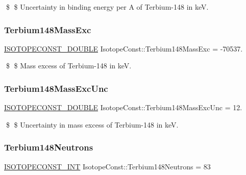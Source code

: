 \$ \$ Uncertainty in binding energy per A of Terbium-\/148 in keV. \mbox{\label{group___isotope_const-_terbium-_tb148_ga271dd9dd29be1b69cdbfdc4c49c16448}} 
\subsubsection{\texorpdfstring{Terbium148\+Mass\+Exc}{Terbium148MassExc}}
{\footnotesize\ttfamily \mbox{\hyperlink{group___isotope_const-_macros_ga8f45a7272ce02c0b4c65c44636ed719a}{I\+S\+O\+T\+O\+P\+E\+C\+O\+N\+S\+T\+\_\+\+D\+O\+U\+B\+LE}} Isotope\+Const\+::\+Terbium148\+Mass\+Exc = -\/70537.}

\$ \$ Mass excess of Terbium-\/148 in keV. \mbox{\label{group___isotope_const-_terbium-_tb148_gae7d67e8dffdd59c50efca6190f0bb47f}} 
\subsubsection{\texorpdfstring{Terbium148\+Mass\+Exc\+Unc}{Terbium148MassExcUnc}}
{\footnotesize\ttfamily \mbox{\hyperlink{group___isotope_const-_macros_ga8f45a7272ce02c0b4c65c44636ed719a}{I\+S\+O\+T\+O\+P\+E\+C\+O\+N\+S\+T\+\_\+\+D\+O\+U\+B\+LE}} Isotope\+Const\+::\+Terbium148\+Mass\+Exc\+Unc = 12.}

\$ \$ Uncertainty in mass excess of Terbium-\/148 in keV. \mbox{\label{group___isotope_const-_terbium-_tb148_gaa2ed213dcf14dcffc66aa8aa5ffc428a}} 
\subsubsection{\texorpdfstring{Terbium148\+Neutrons}{Terbium148Neutrons}}
{\footnotesize\ttfamily \mbox{\hyperlink{group___isotope_const-_macros_ga5f18360b3e99483a35c32d789e62621c}{I\+S\+O\+T\+O\+P\+E\+C\+O\+N\+S\+T\+\_\+\+I\+NT}} Isotope\+Const\+::\+Terbium148\+Neutrons = 83}

